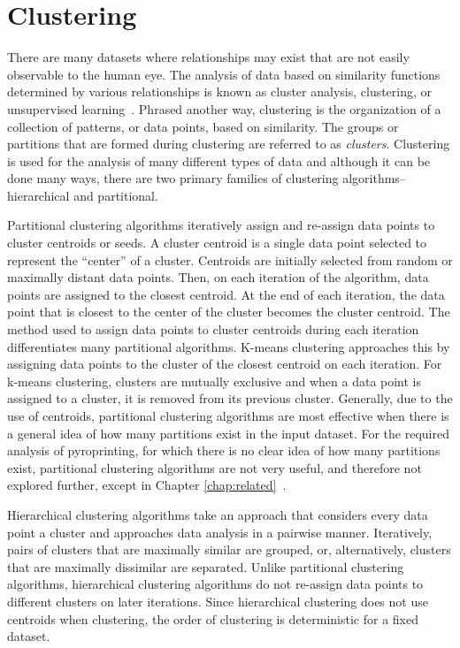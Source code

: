 \documentclass[12pt]{ucthesis}
\begin{document}
   \section{Clustering}\label{sec:clustering}
      There are many datasets where relationships may exist that are not easily
      observable to the human eye. The analysis of data based on similarity
      functions determined by various relationships is known as cluster
      analysis, clustering, or unsupervised
      learning~\cite{Jain:DataClustering}. Phrased another way, clustering is
      the organization of a collection of patterns, or data points, based on
      similarity. The groups or partitions that are formed during clustering
      are referred to as \textit{clusters}. Clustering is used for the analysis
      of many different types of data and although it can be done many ways,
      there are two primary families of clustering algorithms--hierarchical and
      partitional.

      Partitional clustering algorithms iteratively assign and re-assign data
      points to cluster centroids or seeds. A cluster centroid is a single data
      point selected to represent the ``center'' of a cluster. Centroids are
      initially selected from random or maximally distant data points. Then, on
      each iteration of the algorithm, data points are assigned to the closest
      centroid. At the end of each iteration, the data point that is closest to
      the center of the cluster becomes the cluster centroid. The method used
      to assign data points to cluster centroids during each iteration
      differentiates many partitional algorithms. \textsf{K-means clustering}
      approaches this by assigning data points to the cluster of the closest
      centroid on each iteration. For \textsf{k-means clustering}, clusters are
      mutually exclusive and when a data point is assigned to a cluster, it is
      removed from its previous cluster. Generally, due to the use of
      centroids, partitional clustering algorithms are most effective when
      there is a general idea of how many partitions exist in the input
      dataset. For the required analysis of pyroprinting, for which there is no
      clear idea of how many partitions exist, partitional clustering
      algorithms are not very useful, and therefore not explored further,
      except in Chapter \ref{chap:related}~\cite{Jain:DataClustering}.

      Hierarchical clustering algorithms take an approach that considers every
      data point a cluster and approaches data analysis in a pairwise manner.
      Iteratively, pairs of clusters that are maximally similar are grouped,
      or, alternatively, clusters that are maximally dissimilar are separated.
      Unlike partitional clustering algorithms, hierarchical clustering
      algorithms do not re-assign data points to different clusters on later
      iterations. Since hierarchical clustering does not use centroids when
      clustering, the order of clustering is deterministic for a fixed
      dataset.
\end{document}
